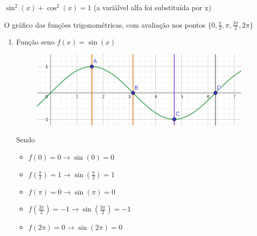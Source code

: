 \begin{multicols*}{2}
    $\sin^2(x) + \cos^2(x) = 1$ (a variálvel alfa foi substituída por x)

    O gráfico das funções trigonométricas, com avaliação nos pontos
    $\Big\{ 0, \frac{\pi}{2}, \pi, \frac{3 \pi}{2}, 2 \pi \Big\}$

    \begin{enumerate}[wide, labelwidth=!, labelindent=0pt]
        \item Função seno $f(x) = \sin(x)$
              \begin{figure}[H]
                  \centering
                  \includegraphics[scale=0.3]{assets/rafael/img33.png}
              \end{figure}
              Sendo
              \begin{itemize}
                  \item $f(0) = 0 \rightarrow \sin(0) = 0 $
                  \item $f\left(\frac{\pi}{2} \right) = 1 \rightarrow \sin \left( \frac{\pi}{2} \right) = 1 $
                  \item $f(\pi) = 0 \rightarrow \sin(\pi) = 0$
                  \item $f\left( \frac{3 \pi}{2} \right) = -1 \rightarrow \sin \left( \frac{3 \pi}{2}\right) = -1$
                  \item $f(2 \pi) = 0 \rightarrow \sin(2 \pi) = 0$
              \end{itemize}


\end{enumerate}
\end{multicols*}
